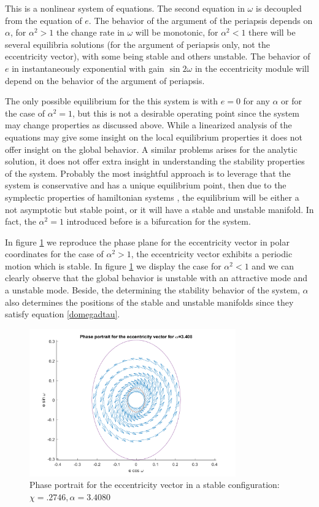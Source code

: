 This is a nonlinear system of equations. The second equation in $\omega$ is decoupled from the equation of $e$. The behavior of the argument of the periapsis depends on $\alpha$, for $\alpha^2>1$ the change rate in $\omega$ will be monotonic, for $\alpha^2<1$ there will be several equilibria solutions (for the argument of periapsis only, not the eccentricity vector), with some being stable and others unstable. The behavior of $e$ in instantaneously exponential with gain $\sin 2\omega$ in the eccentricity module will depend on the behavior of the argument of periapsis. 

The only possible equilibrium for the this system is with $e=0$ for any $\alpha$ or for the case of $\alpha^2=1$, but this is not a desirable operating point since the system may change properties as discussed above. While a linearized analysis of the equations may give some insight on the local equilibrium properties it does not offer insight on the global behavior. A similar problems arises for the analytic solution, it does not offer extra insight in understanding the stability properties of the system. Probably the most insightful approach is to leverage that the system is conservative and has a unique equilibrium point, then due to the symplectic properties of hamiltonian systems \cite{scheeres2012orbital55} \cite{meirovitch1970methods}, the equilibrium will be either a not asymptotic but stable point, or it will have a stable and unstable manifold. In fact, the $\alpha^2=1$ introduced before is a bifurcation for the system.

In figure \ref{fig:eccentricityPhasePortraitStable} we reproduce the phase plane for the eccentricity vector in polar coordinates for the case of $\alpha^2>1$, the eccentricity vector exhibits a periodic motion which is stable. In figure \ref{fig:eccentricityPhasePortraitStable} we display the case for $\alpha^2<1$ and we can clearly observe that the global behavior is unstable with an attractive mode and a unstable mode. Beside, the determining the stability behavior of the system, $\alpha$ also determines the positions of the stable and unstable manifolds since they satisfy equation \ref{domegadtau}.

\begin{figure}[h]
	\centering
	\includegraphics[height=2.5in]
	{figures/Europe400km01e30i/EccentricityPhasePortrait.png}
	\caption{Phase portrait for the eccentricity vector in a stable configuration: $\chi = .2746, \alpha = 3.4080$}
	\label{fig:eccentricityPhasePortraitStable}
\end{figure}

